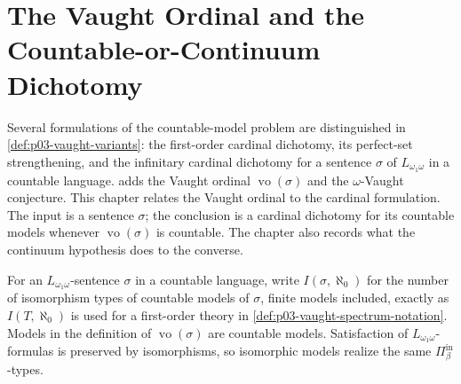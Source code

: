 \chapter{The Vaught Ordinal and the Countable-or-Continuum Dichotomy}
\label{sec:p03-w03-p03-016-vaught-ordinal}

Several formulations of the countable-model problem are distinguished in
\cref{def:p03-vaught-variants}: the first-order cardinal dichotomy, its
perfect-set strengthening, and the infinitary cardinal dichotomy for a
sentence \(\sigma\) of \(L_{\omega_1\omega}\) in a countable language.
 adds the Vaught ordinal
\(\operatorname{vo}(\sigma)\) and the \(\omega\)-Vaught conjecture.
This chapter relates the Vaught ordinal to the cardinal formulation. The input is a sentence
\(\sigma\); the conclusion is a cardinal dichotomy for its countable models
whenever \(\operatorname{vo}(\sigma)\) is countable. The chapter also
records what the continuum hypothesis does to the converse.

For an \(L_{\omega_1\omega}\)-sentence \(\sigma\) in a countable language,
write \(I(\sigma,\aleph_0)\) for the number of isomorphism types of countable
models of \(\sigma\), finite models included, exactly as \(I(T,\aleph_0)\)
is used for a first-order theory in \cref{def:p03-vaught-spectrum-notation}.
Models in the definition of \(\operatorname{vo}(\sigma)\) are countable
models. Satisfaction of \(L_{\omega_1\omega}\)-formulas is preserved by
isomorphisms, so isomorphic models realize the same
\(\Pi^{\mathrm{in}}_\beta\)-types.

